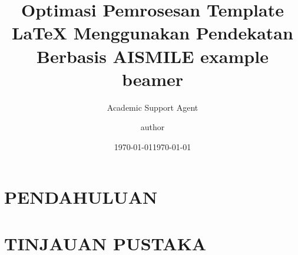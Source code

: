 \documentclass{beamer}
\title{Optimasi Pemrosesan Template LaTeX Menggunakan Pendekatan Berbasis AI}
\author{Academic Support Agent}
\date{\today}
\begin{document}
\maketitle

\begin{abstract}

\end{abstract}

\chapter{PENDAHULUAN}


\chapter{TINJAUAN PUSTAKA}


\hypersetup{
        unicode=true,
        linkcolor=blue,
        anchorcolor=blue,
        citecolor=green,
        filecolor=black,
        urlcolor=blue
    }

\usepackage{amsmath}
\usepackage{amssymb}
\usepackage{listings}
\usepackage[cache=false]{minted}
\usepackage{textcomp}


\usepackage[style=authortitle,backend=biber]{biblatex}




\title{SMILE example beamer}
\author{author}
\date\today
\end{document}

